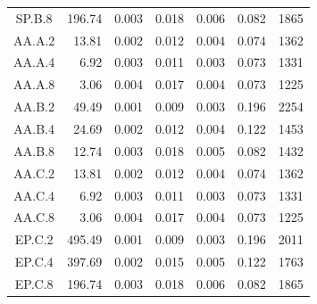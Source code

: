 \begin{ThreePartTable}
\begin{longtable}[c]{c*{6}{r}}
    SP.B.8                 & 196.74                              & 0.003                               & 0.018          & 0.006 & 0.082 & 1865   \\
    AA.A.2                 & 13.81                               & 0.002                               & 0.012          & 0.004 & 0.074 & 1362   \\
    AA.A.4                 & 6.92                                & 0.003                               & 0.011          & 0.003 & 0.073 & 1331   \\
    AA.A.8                 & 3.06                                & 0.004                               & 0.017          & 0.004 & 0.073 & 1225   \\
    AA.B.2                 & 49.49                               & 0.001                               & 0.009          & 0.003 & 0.196 & 2254   \\
    AA.B.4                 & 24.69                               & 0.002                               & 0.012          & 0.004 & 0.122 & 1453   \\
    AA.B.8                 & 12.74                               & 0.003                               & 0.018          & 0.005 & 0.082 & 1432   \\
    AA.C.2                 & 13.81                               & 0.002                               & 0.012          & 0.004 & 0.074 & 1362   \\
    AA.C.4                 & 6.92                                & 0.003                               & 0.011          & 0.003 & 0.073 & 1331   \\
    AA.C.8                 & 3.06                                & 0.004                               & 0.017          & 0.004 & 0.073 & 1225   \\
    EP.C.2                 & 495.49                              & 0.001                               & 0.009          & 0.003 & 0.196 & 2011   \\
    EP.C.4                 & 397.69                              & 0.002                               & 0.015          & 0.005 & 0.122 & 1763   \\
    EP.C.8                 & 196.74                              & 0.003                               & 0.018          & 0.006 & 0.082 & 1865   \\
    \bottomrule
  \end{longtable}
\end{ThreePartTable}



